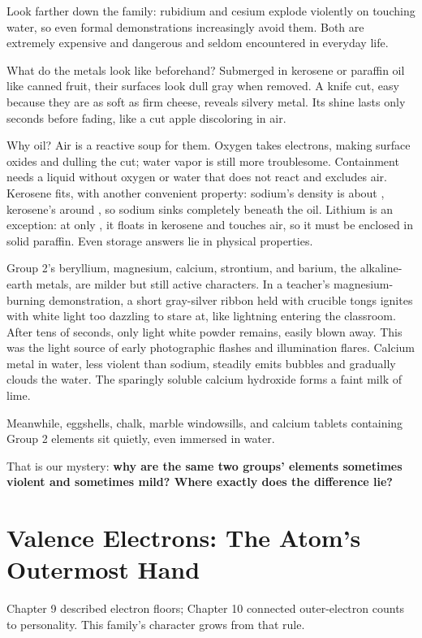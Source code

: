 Look farther down the family: rubidium and cesium explode violently on touching water, so even formal demonstrations increasingly avoid them. Both are extremely expensive and dangerous and seldom encountered in everyday life.

What do the metals look like beforehand? Submerged in kerosene or paraffin oil like canned fruit, their surfaces look dull gray when removed. A knife cut, easy because they are as soft as firm cheese, reveals silvery metal. Its shine lasts only seconds before fading, like a cut apple discoloring in air.

Why oil? Air is a reactive soup for them. Oxygen takes electrons, making surface oxides and dulling the cut; water vapor is still more troublesome. Containment needs a liquid without oxygen or water that does not react and excludes air. Kerosene fits, with another convenient property: sodium's density is about , kerosene's around , so sodium sinks completely beneath the oil. Lithium is an exception: at only , it floats in kerosene and touches air, so it must be enclosed in solid paraffin. Even storage answers lie in physical properties.

Group 2's beryllium, magnesium, calcium, strontium, and barium, the alkaline-earth metals, are milder but still active characters. In a teacher's magnesium-burning demonstration, a short gray-silver ribbon held with crucible tongs ignites with white light too dazzling to stare at, like lightning entering the classroom. After tens of seconds, only light white powder remains, easily blown away. This was the light source of early photographic flashes and illumination flares. Calcium metal in water, less violent than sodium, steadily emits bubbles and gradually clouds the water. The sparingly soluble calcium hydroxide forms a faint milk of lime.

Meanwhile, eggshells, chalk, marble windowsills, and calcium tablets containing Group 2 elements sit quietly, even immersed in water.

That is our mystery: \textbf{why are the same two groups' elements sometimes violent and sometimes mild? Where exactly does the difference lie?}

\section{Valence Electrons: The Atom's Outermost Hand}

Chapter 9 described electron floors; Chapter 10 connected outer-electron counts to personality. This family's character grows from that rule.

